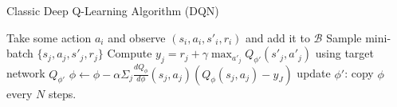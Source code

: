 \begin{algorithm}[t!]
\caption{Classic Deep Q-Learning Algorithm (DQN)}
\begin{algorithmic}[1]
\label{alg:dqn}
    \STATE Take some action $a_i$ and observe $(s_i,a_i,s'_i,r_i)$ and add it to $\mathcal{B}$
    \STATE Sample mini-batch $\{s_j,a_j,s'_j,r_j\}$
    \STATE Compute $y_j = r_j + \gamma \max_{a'_j}Q_{\phi'}(s'_j,a'_j)$ using target network $Q_{\phi'}$
    \STATE $\phi \leftarrow \phi-\alpha\Sigma_j\frac{dQ_\phi}{d\phi}(s_j,a_j)(Q_\phi(s_j,a_j) - y_J)$
    \STATE update $\phi'$: copy $\phi$ every $N$ steps.
\ENDWHILE
\end{algorithmic}
\end{algorithm}